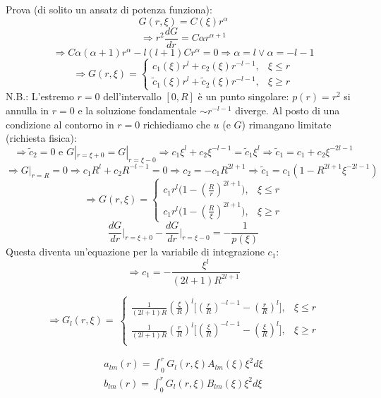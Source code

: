 \documentclass[a4paper,11pt]{report}
\begin{document}
Prova (di solito un ansatz di potenza funziona):
\[
G(r,\xi)=C(\xi)r^\alpha
\]
\[
\Rightarrow r^2\frac{dG}{dr}=C\alpha r^{\alpha+1}
\]
\[
\Rightarrow C\alpha(\alpha+1)r^\alpha - l(l+1)Cr^\alpha=0 \Rightarrow \alpha=l \vee \alpha=-l-1
\]
\[
\Rightarrow G(r,\xi)=
\begin{cases}
c_1(\xi)r^l + c_2(\xi)r^{-l-1}, & \xi\leq r\\
\tilde{c}_1(\xi)r^l + \tilde{c}_2(\xi)r^{-l-1}, & \xi \geq r
\end{cases}
\]
N.B.: L'estremo $r=0$ dell'intervallo $[0,R]$ \`e un punto singolare: $p(r)=r^2$ si annulla in $r=0$ e la soluzione fondamentale $\sim r^{-l-1}$ diverge.
Al posto di una condizione al contorno in $r=0$ richiediamo che $u$ (e $G$) rimangano limitate (richiesta fisica):
\[
\Rightarrow \tilde{c}_2=0 \text{ e }G|_{r=\xi+0}=G|_{r=\xi-0} \Rightarrow c_1\xi^l + c_2\xi^{-l-1}=\tilde{c}_1\xi^l \Rightarrow \tilde{c}_1=c_1 + c_2 \xi^{-2l-1}
\]
\[
\Rightarrow G|_{r=R}=0 \Rightarrow c_1R^l+c_2R^{-l-1}=0 \Rightarrow c_2=-c_1R^{2l + 1} \Rightarrow \tilde{c}_1=c_1(1-R^{2l+1}\xi^{-2l-1})
\]
\[
\Rightarrow G(r,\xi)=
\begin{cases}
c_1r^l \big(1-(\frac{R}{r})^{2l+1} \big), & \xi\leq r \\
c_1r^l \big(1-(\frac{R}{\xi})^{2l+1} \big), & \xi\geq r 
\end{cases}
\]
\[
\frac{dG}{dr}\Big|_{r=\xi+0}-\frac{dG}{dr}\Big|_{r=\xi-0}=-\frac{1}{p(\xi)}
\]
Questa diventa un'equazione per la variabile di integrazione $c_1$:
\[
\Rightarrow c_1=-\frac{\xi^l}{(2l+1)R^{2l+1}}
\]

\begin{equation}
\Rightarrow G_l(r,\xi)=\
\begin{cases}
\frac{1}{(2l+1)R}(\frac{\xi}{R})^l \big[(\frac{r}{R})^{-l-1} - (\frac{r}{R})^l \big], & \xi\leq r\\
\frac{1}{(2l+1)R}(\frac{r}{R})^l \big[(\frac{\xi}{R})^{-l-1} - (\frac{\xi}{R})^l \big], & \xi\geq r\\
\end{cases}
\label{2.86}
\end{equation}

\begin{equation}
\begin{gathered}
a_{lm}(r)=\int_0^r G_l(r, \xi) A_{lm}(\xi) \xi^2 d\xi \\
b_{lm}(r)=\int_0^r G_l(r, \xi) B_{lm}(\xi) \xi^2 d\xi
\end{gathered}
\label{2.87}
\end{equation}
\end{document}
